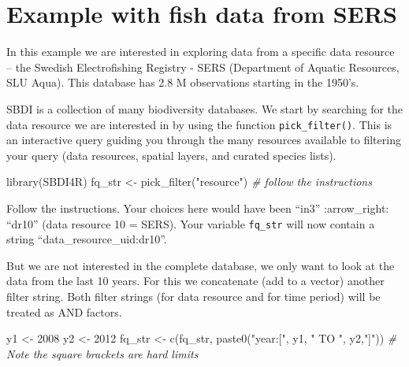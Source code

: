 \documentclass[
  10pt,
]{article}
\newenvironment{Shaded}{\begin{snugshade}}{\end{snugshade}}
\newcommand{\CommentTok}[1]{\textcolor[rgb]{0.56,0.35,0.01}{\textit{#1}}}
\newcommand{\DecValTok}[1]{\textcolor[rgb]{0.00,0.00,0.81}{#1}}
\newcommand{\FunctionTok}[1]{\textcolor[rgb]{0.00,0.00,0.00}{#1}}
\newcommand{\NormalTok}[1]{#1}
\newcommand{\OtherTok}[1]{\textcolor[rgb]{0.56,0.35,0.01}{#1}}
\newcommand{\StringTok}[1]{\textcolor[rgb]{0.31,0.60,0.02}{#1}}
\begin{document}
\hypertarget{example-with-fish-data-from-sers}{%
\section{Example with fish data from SERS}\label{example-with-fish-data-from-sers}}

In this example we are interested in exploring data from a specific data resource -- the Swedish Electrofishing Registry - SERS (Department of Aquatic Resources, SLU Aqua). This database has 2.8 M observations starting in the 1950's.

SBDI is a collection of many biodiversity databases. We start by searching for the data resource we are interested in by using the function \texttt{pick\_filter()}. This is an interactive query guiding you through the many resources available to filtering your query (data resources, spatial layers, and curated species lists).

\begin{Shaded}
\begin{Highlighting}[]
\FunctionTok{library}\NormalTok{(SBDI4R)}
\NormalTok{fq\_str }\OtherTok{\textless{}{-}} \FunctionTok{pick\_filter}\NormalTok{(}\StringTok{"resource"}\NormalTok{) }
\CommentTok{\# follow the instructions }
\end{Highlighting}
\end{Shaded}

Follow the instructions. Your choices here would have been ``in3'' :arrow\_right: ``dr10'' (data resource 10 = SERS). Your variable \texttt{fq\_str} will now contain a string ``data\_resource\_uid:dr10''.

But we are not interested in the complete database, we only want to look at the data from the last 10 years. For this we concatenate (add to a vector) another filter string. Both filter strings (for data resource and for time period) will be treated as AND factors.

\begin{Shaded}
\begin{Highlighting}[]
\NormalTok{y1 }\OtherTok{\textless{}{-}} \DecValTok{2008}
\NormalTok{y2 }\OtherTok{\textless{}{-}} \DecValTok{2012}
\NormalTok{fq\_str }\OtherTok{\textless{}{-}} \FunctionTok{c}\NormalTok{(fq\_str, }\FunctionTok{paste0}\NormalTok{(}\StringTok{"year:["}\NormalTok{, y1, }\StringTok{" TO "}\NormalTok{, y2,}\StringTok{"]"}\NormalTok{))}
\CommentTok{\# Note the square brackets are hard limits}
\end{Highlighting}
\end{Shaded}
\end{document}
